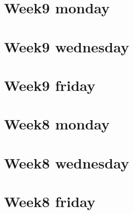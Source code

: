 
\section*{Week9 monday}

\vfill
\section*{Week9 wednesday}

\vfill
\section*{Week9 friday}

\vfill
\section*{Week8 monday}

\vfill
\section*{Week8 wednesday}

\vfill
\section*{Week8 friday}

\vfill
